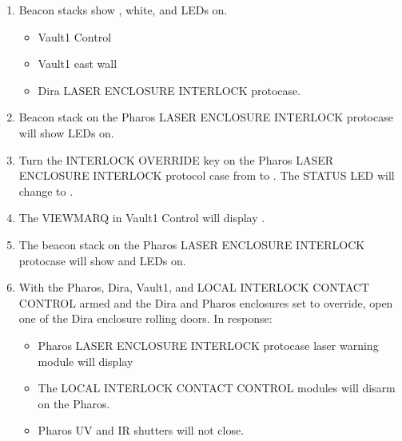 \documentclass[letterpaper,10pt,english]{sphinxmanual}
\begin{document}
\begin{enumerate}
\item {} 
\sphinxAtStartPar
Beacon stacks show , white, and  LEDs on.
\begin{itemize}
\item {} 
\sphinxAtStartPar
Vault\sphinxhyphen{}1 Control

\item {} 
\sphinxAtStartPar
Vault\sphinxhyphen{}1 east wall

\item {} 
\sphinxAtStartPar
Dira LASER ENCLOSURE INTERLOCK protocase.

\end{itemize}

\item {} 
\sphinxAtStartPar
Beacon stack on the Pharos LASER ENCLOSURE INTERLOCK protocase will show  LEDs on.

\item {} 
\sphinxAtStartPar
Turn the INTERLOCK OVERRIDE key on the Pharos LASER ENCLOSURE INTERLOCK protocol case from  to . The STATUS LED will change to .

\item {} 
\sphinxAtStartPar
The VIEWMARQ in Vault\sphinxhyphen{}1 Control will display .

\item {} 
\sphinxAtStartPar
The beacon stack on the Pharos LASER ENCLOSURE INTERLOCK protocase will show  and  LEDs on.

\item {} 
\sphinxAtStartPar
With the Pharos, Dira, Vault\sphinxhyphen{}1, and LOCAL INTERLOCK CONTACT CONTROL armed and the Dira and Pharos enclosures set to override, open one of the Dira enclosure rolling doors.
In response:
\begin{itemize}
\item {} 
\sphinxAtStartPar
Pharos LASER ENCLOSURE INTERLOCK protocase laser warning module will display 

\item {} 
\sphinxAtStartPar
The LOCAL INTERLOCK CONTACT CONTROL modules will disarm on the Pharos.

\item {} 
\sphinxAtStartPar
Pharos UV and IR shutters will not close.


\end{itemize}
\end{enumerate}
\end{document}
